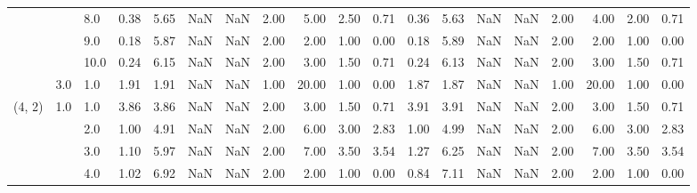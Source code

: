 \begin{tabular}{lllrrrrrrrrrrrrrrrr}
       &     & 8.0  &      0.38 &       5.65 &               NaN &                NaN & 2.00 &   5.00 &             2.50 &                         0.71 &      0.36 &       5.63 &               NaN &                NaN & 2.00 &   4.00 &             2.00 &                         0.71 \\
       &     & 9.0  &      0.18 &       5.87 &               NaN &                NaN & 2.00 &   2.00 &             1.00 &                         0.00 &      0.18 &       5.89 &               NaN &                NaN & 2.00 &   2.00 &             1.00 &                         0.00 \\
       &     & 10.0 &      0.24 &       6.15 &               NaN &                NaN & 2.00 &   3.00 &             1.50 &                         0.71 &      0.24 &       6.13 &               NaN &                NaN & 2.00 &   3.00 &             1.50 &                         0.71 \\
       & 3.0 & 1.0  &      1.91 &       1.91 &               NaN &                NaN & 1.00 &  20.00 &             1.00 &                         0.00 &      1.87 &       1.87 &               NaN &                NaN & 1.00 &  20.00 &             1.00 &                         0.00 \\
(4, 2) & 1.0 & 1.0  &      3.86 &       3.86 &               NaN &                NaN & 2.00 &   3.00 &             1.50 &                         0.71 &      3.91 &       3.91 &               NaN &                NaN & 2.00 &   3.00 &             1.50 &                         0.71 \\
       &     & 2.0  &      1.00 &       4.91 &               NaN &                NaN & 2.00 &   6.00 &             3.00 &                         2.83 &      1.00 &       4.99 &               NaN &                NaN & 2.00 &   6.00 &             3.00 &                         2.83 \\
       &     & 3.0  &      1.10 &       5.97 &               NaN &                NaN & 2.00 &   7.00 &             3.50 &                         3.54 &      1.27 &       6.25 &               NaN &                NaN & 2.00 &   7.00 &             3.50 &                         3.54 \\
       &     & 4.0  &      1.02 &       6.92 &               NaN &                NaN & 2.00 &   2.00 &             1.00 &                         0.00 &      0.84 &       7.11 &               NaN &                NaN & 2.00 &   2.00 &             1.00 &                         0.00 \\

\end{tabular}
